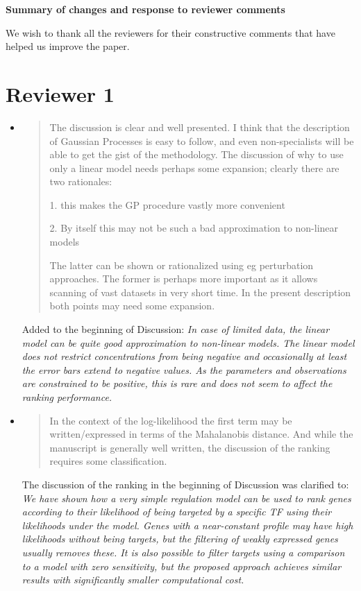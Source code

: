\documentclass{article}
\begin{document}
\begin{center}
\textbf{\LARGE Summary of changes and response to reviewer comments}
\end{center}

We wish to thank all the reviewers for their constructive comments
that have helped us improve the paper.

\section*{Reviewer 1}

\begin{itemize}
\item
  \begin{quote}
    The discussion is clear and well presented. I think that the
    description of Gaussian Processes is easy to follow, and even
    non-specialists will be able to get the gist of the
    methodology. The discussion of why to use only a linear model
    needs perhaps some expansion; clearly there are two rationales:

1. this makes the GP procedure vastly more convenient 

2. By itself this may not be such a bad approximation to non-linear models 

The latter can be shown or rationalized using eg perturbation
approaches. The former is perhaps more important as it allows scanning
of vast datasets in very short time. In the present description both
points may need some expansion.
  \end{quote}

Added to the beginning of Discussion:
\emph{In case of limited data, the linear model can be quite good
approximation to non-linear models.
The linear model does not restrict concentrations from being negative
and occasionally at least the error bars extend to negative values.
As the parameters and observations are constrained to be positive,
this is rare and does not seem to affect the ranking performance.}

\item \begin{quote} In the context of the log-likelihood the first
    term may be written/expressed in terms of the Mahalanobis
    distance. And while the manuscript is generally well written, the
    discussion of the ranking requires some classification.
  \end{quote}

The discussion of the ranking in the beginning of Discussion was
clarified to:
\emph{We have shown how a very simple regulation model can be used to rank
genes according to their likelihood of being targeted by a specific
TF using their likelihoods under the model.  Genes with a
near-constant profile may have high likelihoods without being targets,
but the filtering of weakly expressed genes usually removes these.  It
is also possible to filter targets using a comparison to a model with
zero sensitivity, but the proposed approach achieves similar results
with significantly smaller computational cost.}


\end{itemize}
\end{document}
